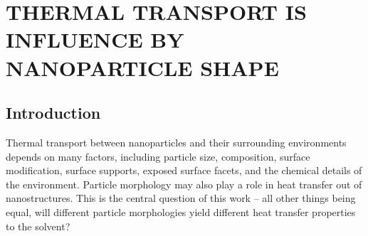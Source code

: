 \chapter{THERMAL TRANSPORT IS INFLUENCE BY NANOPARTICLE SHAPE}\label{chap:morph}


\section{Introduction}
Thermal transport between nanoparticles and their surrounding
environments depends on many factors, including particle
size,\cite{Zanjani2014,Liu2015,Wilhelmsen2015,Stocker2016,Tascini2016}
composition,\cite{Wilson:2002uq, Ge:2004yg,Ong:2013rt} surface
modification,\cite{Ge:2004yg,kuang:AuThl,Ong:2013rt,Ong:2014yq,Liu2015,Stocker2016,Hannah2015,Park2016,Meng:2017,Leitner2017}
surface supports,\cite{Schmidt:2010,Park2012} exposed surface
facets,\cite{Norris:2013,Hannah2015,Han:2017} and the chemical details
of the
environment.\cite{Ge2006,Schmidt:2010,Park2012,Ong:2013rt,Ong:2014yq,Wilhelmsen2015,Giri:2016,Park2016,Bhanushali:2017,Yadav:2017}
Particle morphology may also play a role in heat transfer out of
nanostructures.  This is the central question of this work -- all
other things being equal, will different particle morphologies yield
different heat transfer properties to the solvent?

